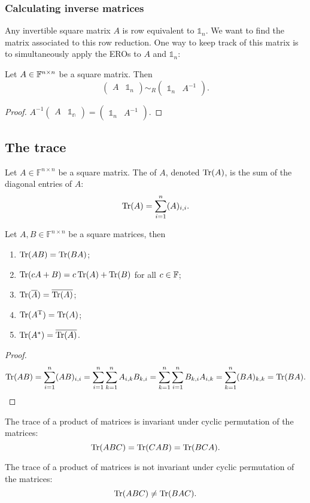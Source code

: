 \subsubsection{Calculating inverse matrices}
Any invertible square matrix $A$ is row equivalent to $\mathbb{1}_n$. We want to find the matrix associated to this row reduction. One way to keep track of this matrix is to simultaneously apply the EROs to $A$ and $\mathbb{1}_n$:
\begin{lemma}
Let $A\in\mathbb{F}^{n\times n}$ be a square matrix. Then
\[ \left(\begin{array}{c|c} A & \mathbb{1}_n \end{array}\right) \sim_R \left(\begin{array}{c|c} \mathbb{1}_n & A^{-1} \end{array}\right). \]
\end{lemma}
\begin{proof}
$A^{-1}\begin{pmatrix}
A & \mathbb{1_n}
\end{pmatrix} = \begin{pmatrix}
\mathbb{1}_n & A^{-1}
\end{pmatrix}$.
\end{proof}


\subsection{The trace}
\begin{definition}
Let $A\in \mathbb{F}^{n\times n}$ be a square matrix. The  of $A$, denoted $\operatorname{Tr}(A)$, is the sum of the diagonal entries of $A$:
\[ \operatorname{Tr}(A) = \sum_{i=1}^n (A)_{i,i}. \]
\end{definition}
\begin{proposition}
Let $A,B\in \mathbb{F}^{n\times n}$ be a square matrices, then
\begin{enumerate}
\item $\operatorname{Tr}(AB) = \operatorname{Tr}(BA)$;
\item $\operatorname{Tr}(cA+B) = c\operatorname{Tr}(A) + \operatorname{Tr}(B)$ for all $c\in\mathbb{F}$;
\item $\operatorname{Tr}(\overline{A}) = \overline{\operatorname{Tr}(A)}$;
\item $\operatorname{Tr}(A^{\mathrm{T}}) = \operatorname{Tr}(A)$;
\item $\operatorname{Tr}(A^*) = \overline{\operatorname{Tr}(A)}$.
\end{enumerate}
\end{proposition}
\begin{proof}
\[ \operatorname{Tr}(AB) = \sum_{i=1}^n (AB)_{i,i} = \sum_{i=1}^n\sum_{k=1}^n A_{i,k}B_{k,i} = \sum_{k=1}^n\sum_{i=1}^n B_{k,i}A_{i,k} = \sum_{k=1}^n (BA)_{k,k} = \operatorname{Tr}(BA). \]
\end{proof}
\begin{corollary}
The trace of a product of matrices is invariant under cyclic permutation of the matrices:
\[ \operatorname{Tr}(ABC) = \operatorname{Tr}(CAB) = \operatorname{Tr}(BCA). \]
\end{corollary}
The trace of a product of matrices is not invariant under cyclic permutation of the matrices:
\[ \operatorname{Tr}(ABC) \neq \operatorname{Tr}(BAC). \]


